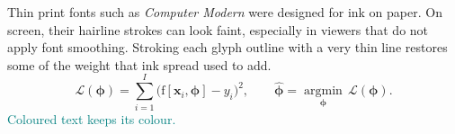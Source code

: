 \documentclass[10pt]{article}
\begin{document}
\noindent Thin print fonts such as \emph{Computer Modern} were designed for ink on
paper. On screen, their hairline strokes can look faint, especially in
viewers that do not apply font smoothing. Stroking each glyph outline with
a very thin line restores some of the weight that ink spread used to add.
\[
  \mathcal{L}(\boldsymbol\phi) = \sum_{i=1}^{I} \bigl(\mathrm{f}[\mathbf{x}_i,\boldsymbol\phi] - y_i\bigr)^2,
  \qquad \hat{\boldsymbol\phi} = \operatorname*{argmin}_{\boldsymbol\phi}\, \mathcal{L}(\boldsymbol\phi).
\]
\textcolor{teal}{Coloured text keeps its colour.}
\end{document}

